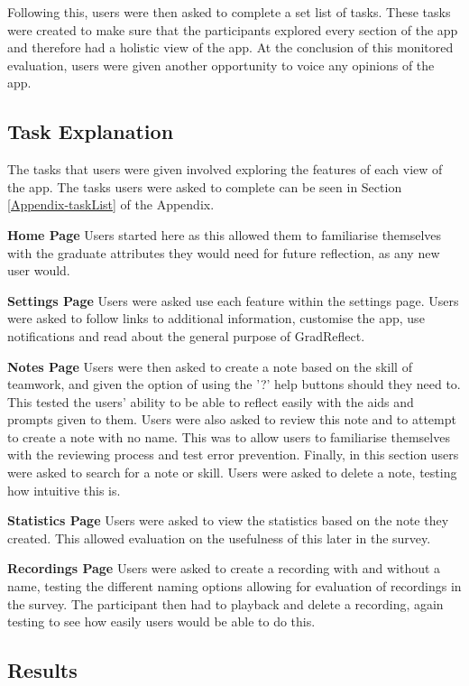 \documentclass{l4proj}
\begin{document}
Following this, users were then asked to complete a set list of tasks. These tasks were created to make sure that the participants explored every section of the app and therefore had a holistic view of the app. At the conclusion of this monitored evaluation, users were given another opportunity to voice any opinions of the app.


\subsection{Task Explanation}

The tasks that users were given involved exploring the features of each view of the app. The tasks users were asked to complete can be seen in Section \ref{Appendix-taskList} of the Appendix.

\textbf{Home Page} Users started here as this allowed them to familiarise themselves with the graduate attributes they would need for future reflection, as any new user would. 
 
\textbf{Settings Page} Users were asked use each feature within the settings page. Users were asked to follow links to additional information, customise the app, use notifications and read about the general purpose of GradReflect.

\textbf{Notes Page} Users were then asked to create a note based on the skill of teamwork, and given the option of using the '?' help buttons should they need to. This tested the users’ ability to be able to reflect easily with the aids and prompts given to them. Users were also asked to review this note and to attempt to create a note with no name. This was to allow users to familiarise themselves with the reviewing process and test error prevention. Finally, in this section users were asked to search for a note or skill. Users were asked to delete a note, testing how intuitive this is.
 
\textbf{Statistics Page} Users were asked to view the statistics based on the note they created. This allowed evaluation on the usefulness of this later in the survey. 

\textbf{Recordings Page} Users were asked to create a recording with and without a name, testing the different naming options allowing for evaluation of recordings in the survey. The participant then had to playback and delete a recording, again testing to see how easily users would be able to do this.

\subsection{Results}
\end{document}
